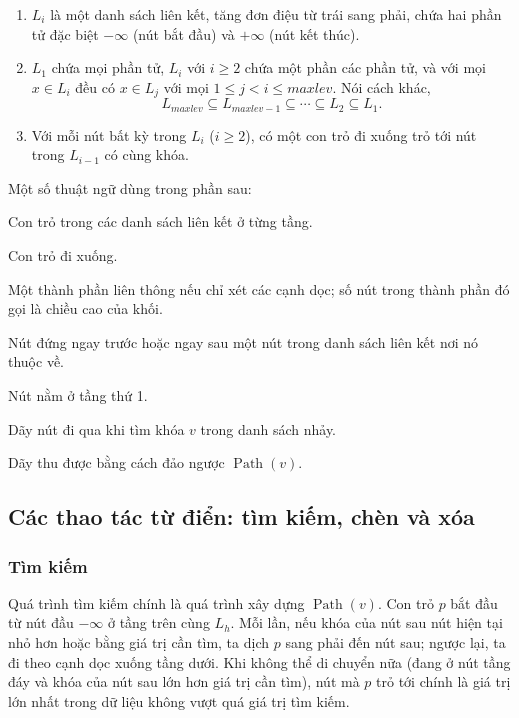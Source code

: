 \documentclass[11pt]{article}
\newcommand{\Path}{\operatorname{Path}}
\newcommand{\RevPath}{\operatorname{Rev\mbox{-}Path}}
\newcommand{\maxlev}{\mathit{maxlev}}
\begin{document}
\begin{enumerate}
  \item $L_i$ là một danh sách liên kết, tăng đơn điệu từ trái sang phải, chứa
  hai phần tử đặc biệt $-\infty$ (nút bắt đầu) và $+\infty$ (nút kết thúc).

  \item $L_1$ chứa mọi phần tử, $L_i$ với $i\ge 2$ chứa một phần các phần tử,
  và với mọi $x\in L_i$ đều có
  $x\in L_j$ với mọi $1\le j<i\le \maxlev$. Nói cách khác,
  \[
    L_{\maxlev}\subseteq L_{\maxlev-1}\subseteq\cdots\subseteq L_2\subseteq L_1.
  \]

  \item Với mỗi nút bất kỳ trong $L_i$ ($i\ge 2$), có một con trỏ đi xuống
  trỏ tới nút trong $L_{i-1}$ có cùng khóa.
\end{enumerate}

Một số thuật ngữ dùng trong phần sau:

\begin{description}[leftmargin=2.6em,style=nextline]
  \item[Cạnh ngang] Con trỏ trong các danh sách liên kết ở từng tầng.
  \item[Cạnh dọc] Con trỏ đi xuống.
  \item[Khối] Một thành phần liên thông nếu chỉ xét các cạnh dọc; số nút trong
  thành phần đó gọi là chiều cao của khối.
  \item[Nút trước, nút sau] Nút đứng ngay trước hoặc ngay sau một nút trong
  danh sách liên kết nơi nó thuộc về.
  \item[Nút đáy] Nút nằm ở tầng thứ 1.
  \item[Đường tìm kiếm $\Path(v)$] Dãy nút đi qua khi tìm khóa $v$ trong danh
  sách nhảy.
  \item[Đường tìm kiếm ngược $\RevPath(v)$] Dãy thu được bằng cách đảo ngược
  $\Path(v)$.
\end{description}

\subsection{Các thao tác từ điển: tìm kiếm, chèn và xóa}

\subsubsection*{Tìm kiếm}

Quá trình tìm kiếm chính là quá trình xây dựng $\Path(v)$. Con trỏ $p$ bắt đầu
từ nút đầu $-\infty$ ở tầng trên cùng $L_h$. Mỗi lần, nếu khóa của nút sau nút
hiện tại nhỏ hơn hoặc bằng giá trị cần tìm, ta dịch $p$ sang phải đến nút sau;
ngược lại, ta đi theo cạnh dọc xuống tầng dưới. Khi không thể di chuyển nữa
(đang ở nút tầng đáy và khóa của nút sau lớn hơn giá trị cần tìm), nút mà $p$
trỏ tới chính là giá trị lớn nhất trong dữ liệu không vượt quá giá trị tìm
kiếm.
\end{document}
